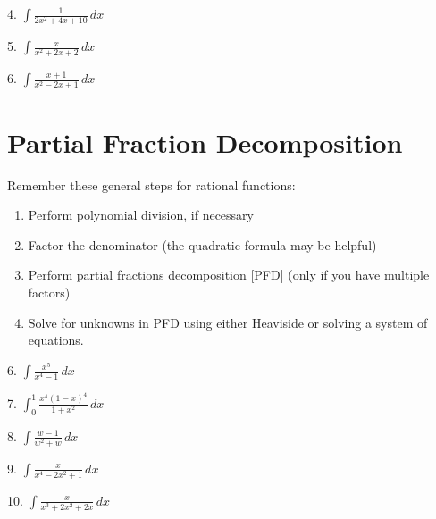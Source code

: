 \documentclass[letterpaper, fontsize=11pt]{scrartcl} %
\numberwithin{equation}{section} %
\numberwithin{figure}{section} %
\numberwithin{table}{section} %
\begin{document}
\vfill

4. \quad $\displaystyle \int \frac{1}{2x^2 + 4x + 10}\,dx$

\vfill

5. \quad $\displaystyle \int \frac{x}{x^2 + 2x + 2}\,dx$

\vfill

\newpage

6. \quad $\displaystyle \int \frac{x + 1}{x^2 - 2x + 1}\,dx$

\vfill

\section*{Partial Fraction Decomposition}

Remember these general steps for rational functions:

\begin{enumerate}
\item Perform polynomial division, if necessary
\item Factor the denominator (the quadratic formula may be helpful)
\item Perform partial fractions decomposition [PFD] (only if you have multiple factors)
\item Solve for unknowns in PFD using either Heaviside or solving a system of equations.
\end{enumerate}

6. \quad $\displaystyle \int \frac{x^5}{x^4 - 1}\,dx$

\vfill

\newpage

7. \quad $\displaystyle \int_0^1 \frac{x^4(1-x)^4}{1 + x^2}\,dx$

\vfill

8. \quad $\displaystyle \int \frac{w - 1}{w^2 + w}\,dx$

\vfill

\newpage

9. \quad $\displaystyle \int \frac{x}{x^4 - 2x^2 + 1}\,dx$

\vfill

10. \quad $\displaystyle \int \frac{x}{x^3 + 2x^2 + 2x}\,dx$

\vfill
\end{document}
